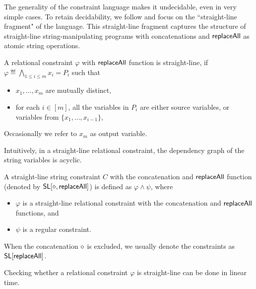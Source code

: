  
The generality of the constraint language makes it undecidable,
even in very simple cases. To retain decidability, we follow \cite{LB16} and focus on the ``straight-line fragment" of the language. This straight-line fragment captures the structure of straight-line string-manipulating
programs with concatenations and $\mathsf{replaceAll}$ as atomic string operations.  

\begin{definition}
	A relational constraint $ \varphi$ with $\mathsf{replaceAll}$ function is straight-line, if $\varphi \eqdef \bigwedge \limits_{1 \le i \le m} x_i = P_i$ such that
	\begin{itemize}
		\item $x_1,\dots, x_m$ are mutually distinct,
		\item for each $i \in [m]$, all the variables in $P_i$ are either source variables, or variables from $\{x_1,\dots, x_{i-1}\}$,
	\end{itemize}
Occasionally we refer to $x_m$ as output variable. 
\end{definition}
Intuitively, in a straight-line relational constraint, the dependency graph of the string variables is acyclic.


\begin{definition}
	A straight-line string constraint $C$ with the concatenation and $\mathsf{replaceAll}$ function (denoted by $\mathsf{SL}[\circ,\mathsf{replaceAll}]$)  is defined as $ \varphi \wedge \psi$,  where 
	\begin{itemize}
		\item $\varphi$ is a straight-line relational constraint with the concatenation and $\mathsf{replaceAll}$ functions,  and
		\item $\psi$ is a regular constraint.
	\end{itemize}
When the concatenation $\circ$ is excluded, we usually denote the constraints as  $\mathsf{SL}[\mathsf{replaceAll}]$. 
\end{definition}

\begin{remark}
Checking whether a relational constraint $\varphi$ is straight-line can be done in linear time. 
\end{remark}

\begin{example}
\end{example}


